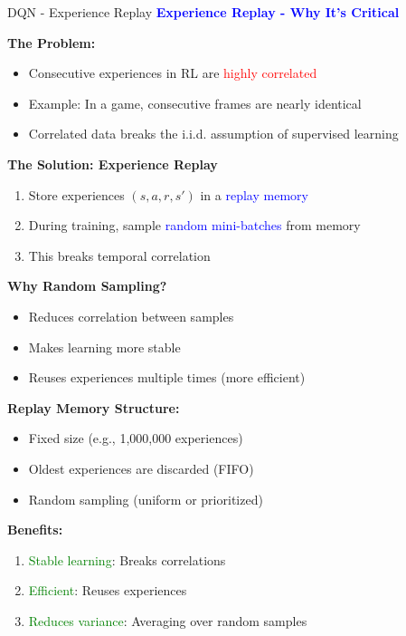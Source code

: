 \documentclass[8pt]{beamer}
\begin{document}
	\begin{frame}{DQN - Experience Replay}
		\fontsize{6.5}{7.5}\selectfont
		\textcolor{blue}{\textbf{Experience Replay - Why It's Critical}}
		
		\textbf{The Problem:}
		\begin{itemize}
			\item Consecutive experiences in RL are \textcolor{red}{highly correlated}
			\item Example: In a game, consecutive frames are nearly identical
			\item Correlated data breaks the i.i.d. assumption of supervised learning
		\end{itemize}
		
		\textbf{The Solution: Experience Replay}
		\begin{enumerate}
			\item Store experiences $(s, a, r, s')$ in a \textcolor{blue}{replay memory}
			\item During training, sample \textcolor{blue}{random mini-batches} from memory
			\item This breaks temporal correlation
		\end{enumerate}
		
		\textbf{Why Random Sampling?}
		\begin{itemize}
			\item Reduces correlation between samples
			\item Makes learning more stable
			\item Reuses experiences multiple times (more efficient)
		\end{itemize}
		
		\textbf{Replay Memory Structure:}
		\begin{itemize}
			\item Fixed size (e.g., 1,000,000 experiences)
			\item Oldest experiences are discarded (FIFO)
			\item Random sampling (uniform or prioritized)
		\end{itemize}
		
		\textbf{Benefits:}
		\begin{enumerate}
			\item \textcolor{green}{Stable learning}: Breaks correlations
			\item \textcolor{green}{Efficient}: Reuses experiences
			\item \textcolor{green}{Reduces variance}: Averaging over random samples
		\end{enumerate}
		

\end{frame}
\end{document}
